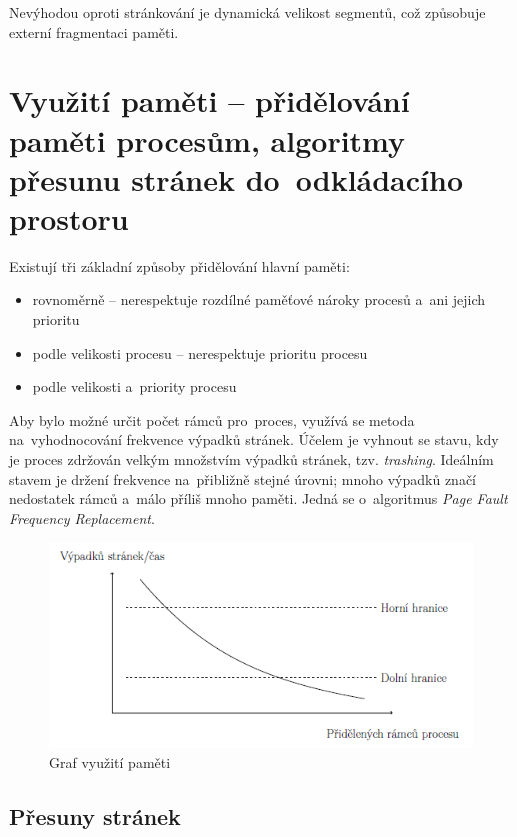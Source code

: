 Nevýhodou oproti stránkování je dynamická velikost segmentů, což způsobuje externí fragmentaci paměti.


\clearpage
\section{Využití paměti -- přidělování paměti procesům, algoritmy přesunu stránek do~odkládacího prostoru}

Existují tři základní způsoby přidělování hlavní paměti:
\begin{itemize}
	\item rovnoměrně -- nerespektuje rozdílné paměťové nároky procesů a~ani jejich prioritu
	\item podle velikosti procesu -- nerespektuje prioritu procesu
	\item podle velikosti a~priority procesu
\end{itemize}

Aby bylo možné určit počet rámců pro~proces, využívá se metoda na~vyhodnocování frekvence výpadků stránek. Účelem je vyhnout se stavu, kdy je proces zdržován velkým množstvím výpadků stránek, tzv. \emph{trashing}. Ideálním stavem je držení frekvence na~přibližně stejné úrovni; mnoho výpadků značí nedostatek rámců a~málo příliš mnoho paměti. Jedná se o~algoritmus \emph{Page Fault Frequency Replacement}.

\begin{figure}[ht]
	\centering
	\includegraphics[scale=1]{images/mem_freq_page.png}
	\caption{Graf využití paměti}
	\label{mem_freq_page}
\end{figure}

\subsection{Přesuny stránek}


